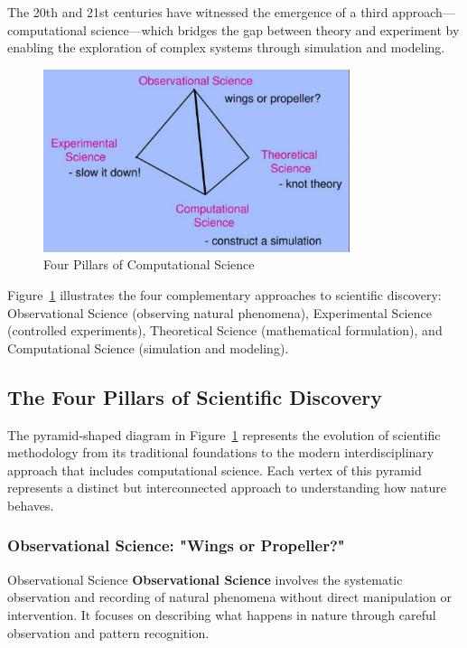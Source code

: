 The 20th and 21st centuries have witnessed the emergence of a third approach—computational science—which bridges the gap between theory and experiment by enabling the exploration of complex systems through simulation and modeling.

\begin{figure}[h]
 \centering
 \includegraphics[width=0.8\textwidth]{images/science_four_pillars.png}
 \caption{Four Pillars of Computational Science}
 \label{fig:science_pillars}
\end{figure}

Figure~\ref{fig:science_pillars} illustrates the four complementary approaches to scientific discovery: Observational Science (observing natural phenomena), Experimental Science (controlled experiments), Theoretical Science (mathematical formulation), and Computational Science (simulation and modeling).

\subsection{The Four Pillars of Scientific Discovery}

The pyramid-shaped diagram in Figure~\ref{fig:science_pillars} represents the evolution of scientific methodology from its traditional foundations to the modern interdisciplinary approach that includes computational science. Each vertex of this pyramid represents a distinct but interconnected approach to understanding how nature behaves.

\subsubsection{Observational Science: "Wings or Propeller?"}

\begin{conceptcard}{Observational Science}
\textbf{Observational Science} involves the systematic observation and recording of natural phenomena without direct manipulation or intervention. It focuses on describing what happens in nature through careful observation and pattern recognition.
\end{conceptcard}

